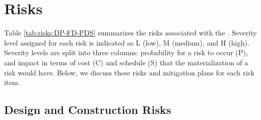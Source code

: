 \section{Risks}
\label{sec:dp-pds-risks}

Table%
\ref{tab:risks:DP-FD-PDS} summarizes the risks associated with the \dual {}. Severity level assigned for each risk is indicated as L (low), M (medium), and H (high). Severity levels are split into three columns: probability for a risk to occur (P), and impact in terms of cost (C) and schedule (S) that the materialization of a risk would have. Below, we discuss these risks and mitigation plans for each risk item.




\subsection{Design and Construction Risks}
\label{sec:dp-pds-risks_design}

